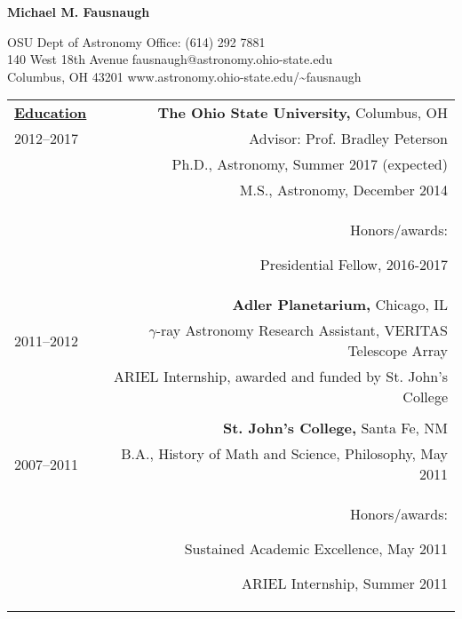 \documentclass[letterpaper,11pt]{article}
\begin{document}
\begin{center}
\huge\bfseries{Michael M. Fausnaugh}
\end{center}

\noindent OSU Dept of Astronomy \hfill Office: (614) 292 7881 \\
140 West 18th Avenue  \hfill fausnaugh@astronomy.ohio-state.edu \\
Columbus, OH 43201    \hfill  www.astronomy.ohio-state.edu/\textasciitilde fausnaugh

%

\vspace{2em}
\begin{longtable}{LR}

\underline{\textbf{Education}} &     

\textbf{The Ohio State University,} Columbus, OH\\
2012--2017   &    Advisor:  Prof. Bradley Peterson\\
&Ph.D., Astronomy, Summer 2017 (expected)\\
&    M.S.,  Astronomy, December 2014\\
&    Honors/awards:
\begin{compactitem}
\item Presidential Fellow, 2016-2017
\end{compactitem}

\\

&\textbf{Adler Planetarium,} Chicago, IL\\
2011--2012&    $\gamma$-ray Astronomy Research Assistant, VERITAS Telescope Array\\
&  ARIEL Internship, awarded and funded by St. John's College \\

\\
&\textbf{St. John's College,} Santa Fe, NM\\
2007--2011&B.A., History of Math and Science, Philosophy,  May 2011\\
&Honors/awards: 
\begin{compactitem} 
\item Sustained Academic Excellence, May 2011
\item  ARIEL Internship, Summer 2011
\end{compactitem}
\\





\end{longtable}
\end{document}
